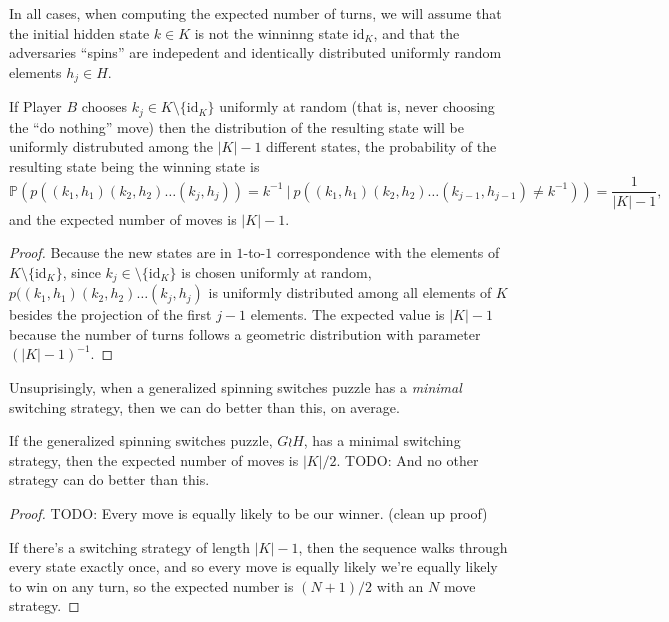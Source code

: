 %

%
In all cases, when computing the expected number of turns, we will assume that
the initial hidden state $k \in K$ is not the winninng state $\mathrm{id}_K$,
and that the adversaries ``spins'' are indepedent and identically distributed
uniformly random elements $h_j \in H$.

\begin{proposition}
  If Player $B$ chooses $k_j \in K \setminus \{\mathrm{id}_K\}$ uniformly at random
  (that is, never choosing the ``do nothing'' move) then the distribution
  of the resulting state will be uniformly distrubuted among the $|K| - 1$
  different states, the probability of the resulting state being the
  winning state is
  \[
    \mathbb{P}(p((k_1, h_1)(k_2, h_2)\dots(k_j, h_j))=k^{-1}\ |\ p((k_1, h_1)(k_2, h_2)\dots(k_{j-1}, h_{j-1})\neq k^{-1})) = \frac{1}{|K| - 1},
  \] and the expected number of moves is $|K| - 1$.
\end{proposition}
\begin{proof}
  Because the new states are in $1$-to-$1$ correspondence with the elements of
  $K \setminus \{\mathrm{id}_K\}$, since $k_j \in \setminus \{\mathrm{id}_K\}$
  is chosen uniformly at random, $p((k_1, h_1)(k_2, h_2)\dots(k_j, h_j)$
  is uniformly distributed among all elements of $K$ besides the projection of
  the first $j-1$ elements.
  The expected value is $|K| - 1$ because the number of turns follows a
  geometric distribution with parameter $(|K| - 1)^{-1}$.
\end{proof}

Unsuprisingly, when a generalized spinning switches puzzle has a
\textit{minimal} switching strategy, then we can do better than this, on average.

\begin{proposition}
If the generalized spinning switches puzzle, $G \wr H$, has a minimal switching
strategy, then the expected number of moves is $|K|/2$.
TODO: And no other strategy can do better than this.
\end{proposition}
\begin{proof}
  TODO: Every move is equally likely to be our winner. (clean up proof)

  If there's a switching strategy of length $|K| - 1$,
  then the sequence walks through every state exactly once,
  and so every move is equally likely
  we're equally likely to win on any turn, so
  the expected number is $(N+1)/2$ with an $N$ move strategy.
\end{proof}

